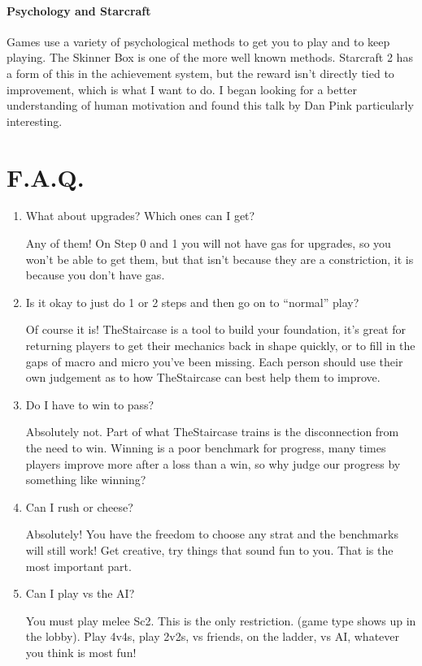 \documentclass{article}
\begin{document}
\paragraph{Psychology and Starcraft}
Games use a variety of psychological methods to get you to play and to keep
playing. The Skinner Box is one of the more well known methods. Starcraft 2
has a form of this in the achievement system, but the reward isn't directly
tied to improvement, which is what I want to do. I began looking for a better
understanding of human motivation and found this talk by Dan Pink particularly
interesting.


\section{F.A.Q.}
\begin{enumerate}
\item What about upgrades? Which ones can I get?

Any of them! On Step 0 and 1 you will not have gas for upgrades, so you won’t
be able to get them, but that isn’t because they are a constriction, it is
because you don’t have gas.

\item Is it okay to just do 1 or 2 steps and then go on to “normal” play?

Of course it is! TheStaircase is a tool to build your foundation, it’s great
for returning players to get their mechanics back in shape quickly, or to fill
in the gaps of macro and micro you’ve been missing. Each person should use
their own judgement as to how TheStaircase can best help them to improve.

\item Do I have to win to pass?

Absolutely not. Part of what TheStaircase trains is the disconnection from the
need to win. Winning is a poor benchmark for progress, many times players
improve more after a loss than a win, so why judge our progress by something
like winning?

\item Can I rush or cheese?

Absolutely! You have the freedom to choose any strat and the benchmarks will
still work! Get creative, try things that sound fun to you. That is the most
important part.

\item Can I play vs the AI?

You must play melee Sc2. This is the only restriction. (game type shows up in
the lobby). Play 4v4s, play 2v2s, vs friends, on the ladder, vs AI, whatever
you think is most fun!
\end{enumerate}
\end{document}
